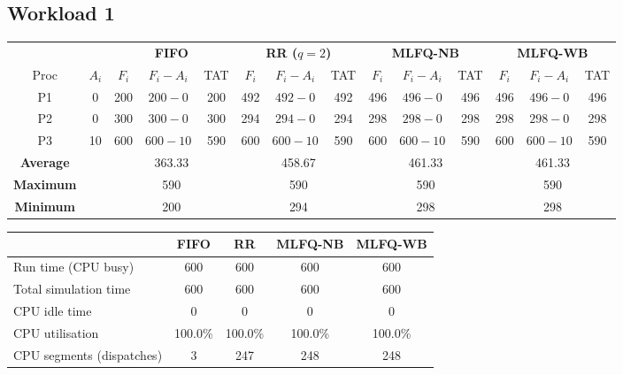 \documentclass[11pt,a4paper]{article}
\begin{document}
\subsection{Workload 1}
\begin{center}\footnotesize\setlength{\tabcolsep}{4pt}
\begin{tabular}{cccccccccccccc}\toprule
& & \multicolumn{3}{c}{\textbf{FIFO}} & \multicolumn{3}{c}{\textbf{RR ($q=2$)}} & \multicolumn{3}{c}{\textbf{MLFQ-NB}} & \multicolumn{3}{c}{\textbf{MLFQ-WB}} \\
\cmidrule(lr){3-5}\cmidrule(lr){6-8}\cmidrule(lr){9-11}\cmidrule(lr){12-14}
Proc & $A_i$ & $F_i$ & $F_i-A_i$ & TAT & $F_i$ & $F_i-A_i$ & TAT & $F_i$ & $F_i-A_i$ & TAT & $F_i$ & $F_i-A_i$ & TAT \\\midrule
P1 & 0 & 200 & $200-0$ & 200 & 492 & $492-0$ & 492 & 496 & $496-0$ & 496 & 496 & $496-0$ & 496 \\
P2 & 0 & 300 & $300-0$ & 300 & 294 & $294-0$ & 294 & 298 & $298-0$ & 298 & 298 & $298-0$ & 298 \\
P3 & 10 & 600 & $600-10$ & 590 & 600 & $600-10$ & 590 & 600 & $600-10$ & 590 & 600 & $600-10$ & 590 \\
\midrule
\textbf{Average} & & \multicolumn{3}{c}{363.33} & \multicolumn{3}{c}{458.67} & \multicolumn{3}{c}{461.33} & \multicolumn{3}{c}{461.33} \\
\textbf{Maximum} & & \multicolumn{3}{c}{590} & \multicolumn{3}{c}{590} & \multicolumn{3}{c}{590} & \multicolumn{3}{c}{590} \\
\textbf{Minimum} & & \multicolumn{3}{c}{200} & \multicolumn{3}{c}{294} & \multicolumn{3}{c}{298} & \multicolumn{3}{c}{298} \\
\bottomrule\end{tabular}\end{center}
\begin{center}\footnotesize\begin{tabular}{lcccc}\toprule
& \textbf{FIFO} & \textbf{RR} & \textbf{MLFQ-NB} & \textbf{MLFQ-WB}\\\midrule
Run time (CPU busy) & 600 & 600 & 600 & 600 \\
Total simulation time & 600 & 600 & 600 & 600 \\
CPU idle time & 0 & 0 & 0 & 0 \\
CPU utilisation & 100.0\% & 100.0\% & 100.0\% & 100.0\% \\
CPU segments (dispatches) & 3 & 247 & 248 & 248 \\
\bottomrule\end{tabular}\end{center}
\end{document}
